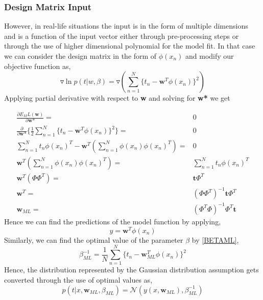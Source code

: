\documentclass[12pt,twoside,a4paper]{article}
\begin{document}
\subsubsection*{Design Matrix Input}
However, in real-life situations the input is in the form of multiple dimensions and is a function of the input vector either through pre-processing steps or through the use of higher dimensional polynomial for the model fit. In that case we can consider the design matrix in the form of $\phi(x_n)$ and modify our objective function as,
 \begin{equation}
     \triangledown\ln p(t|w,\beta) = \triangledown \left( \sum_{n=1}^{N}\{t_n - \textbf{w}^T\phi(x_n)\}^2 \right)
 \end{equation}
Applying partial derivative with respect to \textbf{w} and solving for \textbf{w*} we get

\begin{align}
\frac{\partial E_ML(\textbf{w})}{\partial \textbf{w*}} =& 0\\
\frac{\partial}{\partial \textbf{w*}} \{ \frac{1}{2}\sum_{n=1}^{N}\{t_n - \textbf{w}^T\phi(x_n)\}^2 \} =& 0 \\
\sum_{n=1}^{N}t_n\phi(x_n)^T - \textbf{w}^T\left(\sum_{n=1}^{N}{\phi(x_n)\phi(x_n)^T} \right) =& 0 \\
\textbf{w}^T\left(\sum_{n=1}^{N}{\phi(x_n)\phi(x_n)^T} \right) =& \sum_{n=1}^{N}t_n\phi(x_n)^T \\
\textbf{w}^T(\Phi\Phi^T) =&\textbf{t}\Phi^T \\
\textbf{w}^T =& (\Phi\Phi^T)^{-1}\textbf{t}\Phi^T \\
\textbf{w}_{ML} =& (\Phi^T\Phi)^{-1}\Phi^T\textbf{t} \label{WML}
\end{align}
Hence we can find the predictions of the model function by applying,
\begin{equation} \label{MLPRED2}
    y = \textbf{w}^T\phi(x_n)
\end{equation}
Similarly, we can find the optimal value of the parameter $\beta$ by \eqref{BETAML},
\begin{equation} \label{BETAML}
    \beta_{ML}^{-1} = \frac{1}{N}\sum_{n=1}^{N}\{t_n - \textbf{w}_{ML}^T\phi(x_n)\}^2
\end{equation}
Hence, the distribution represented by the Gaussian distribution assumption gets converted through the use of optimal values as,
\begin{equation} \label{PREDDML}
    p(t|x,\textbf{w}_{ML},\beta_{ML}) = \mathcal{N}(y(x,\textbf{w}_{ML}), \beta^{-1}_{ML})
\end{equation}
\end{document}
